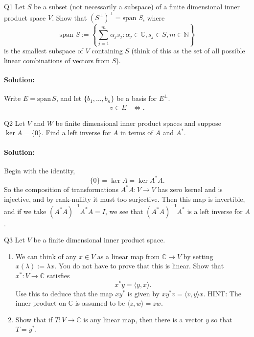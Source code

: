 \documentclass{article}
\begin{document}
\begin{prob}{Q1}
Let $S$ be a subset (not necessarily a subspace) of a finite dimensional inner product space $V$. Show that $(S^\perp)^\perp = \text{span } S$, where
$$\text{span } S := \left\{\sum_{j=1}^m \alpha_j s_j : \alpha_j \in \mathbb{C}, s_j \in S, m \in \mathbb{N}\right\}$$
is the smallest subspace of $V$ containing $S$ (think of this as the set of all possible linear combinations of vectors from $S$).
\end{prob}
\paragraph{Solution: } Write $E=\text{span}\, S$, and let $\{b_1,\ldots,b_n\} $ be a basis for $E^{\perp}$.
\begin{align*}
    v\in E&\iff 
.\end{align*}

\begin{prob}{Q2}
Let $V$ and $W$ be finite dimensional inner product spaces and suppose $\ker A = \{0\}$. Find a left inverse for $A$ in terms of $A$ and $A^*$.
\end{prob}
\paragraph{Solution: } Begin with the identity,
\[ \{0\} =\ker A =\ker A^* A .\] 
So the composition of transformations $A^* A:V\to V$ has zero kernel and is injective, and by rank-nullity it must too surjective. Then this map is invertible, and if we take $(A^* A)^{-1}A^* A=I$, we see that $(A^* A)^{-1}A^* $ is a left inverse for $A$.

\begin{prob}{Q3}
Let $V$ be a finite dimensional inner product space.
\begin{enumerate}[label= (\alph*)] 
\item We can think of any $x \in V$ as a linear map from $\mathbb{C} \to V$ by setting $x(\lambda) := \lambda x$. You do not have to prove that this is linear. Show that $x^*: V \to \mathbb{C}$ satisfies
$$x^* y = \langle y, x\rangle.$$
Use this to deduce that the map $xy^*$ is given by $xy^* v = \langle v, y\rangle x$.
HINT: The inner product on $\mathbb{C}$ is assumed to be $\langle z, w\rangle = z\overline{w}$.
\item Show that if $T: V \to \mathbb{C}$ is any linear map, then there is a vector $y$ so that $T = y^*$.
\end{enumerate}
\end{prob}
\end{document}
